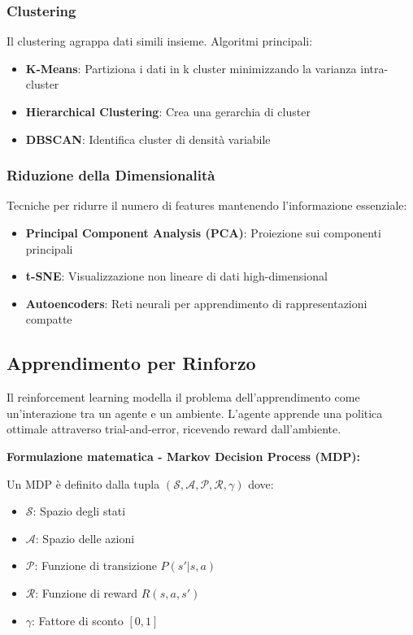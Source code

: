 \documentclass[12pt,a4paper,twoside]{report}
\begin{document}
\subsubsection{Clustering}
Il clustering agrappa dati simili insieme. Algoritmi principali:
\begin{itemize}
    \item \textbf{K-Means}: Partiziona i dati in k cluster minimizzando la varianza intra-cluster
    \item \textbf{Hierarchical Clustering}: Crea una gerarchia di cluster
    \item \textbf{DBSCAN}: Identifica cluster di densità variabile
\end{itemize}

\subsubsection{Riduzione della Dimensionalità}
Tecniche per ridurre il numero di features mantenendo l'informazione essenziale:
\begin{itemize}
    \item \textbf{Principal Component Analysis (PCA)}: Proiezione sui componenti principali
    \item \textbf{t-SNE}: Visualizzazione non lineare di dati high-dimensional
    \item \textbf{Autoencoders}: Reti neurali per apprendimento di rappresentazioni compatte
\end{itemize}

\subsection{Apprendimento per Rinforzo}

Il reinforcement learning modella il problema dell'apprendimento come un'interazione tra un agente e un ambiente. L'agente apprende una politica ottimale attraverso trial-and-error, ricevendo reward dall'ambiente.

\textbf{Formulazione matematica - Markov Decision Process (MDP):}

Un MDP è definito dalla tupla $(\mathcal{S}, \mathcal{A}, \mathcal{P}, \mathcal{R}, \gamma)$ dove:
\begin{itemize}
    \item $\mathcal{S}$: Spazio degli stati
    \item $\mathcal{A}$: Spazio delle azioni
    \item $\mathcal{P}$: Funzione di transizione $P(s'|s,a)$
    \item $\mathcal{R}$: Funzione di reward $R(s,a,s')$
    \item $\gamma$: Fattore di sconto $[0,1]$
\end{itemize}
\end{document}

